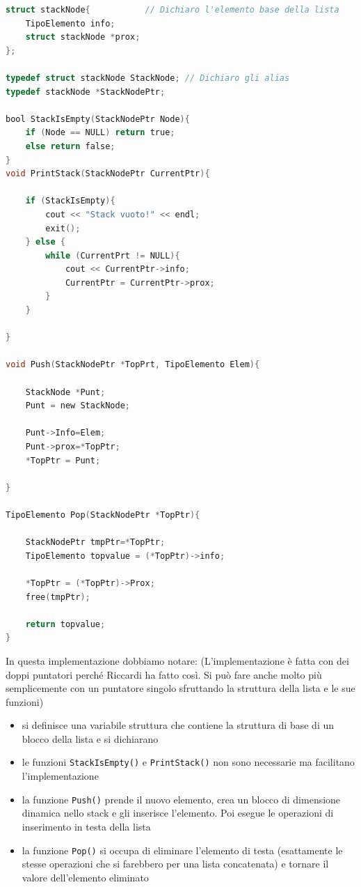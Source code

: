 \documentclass[
  paper=a4,
  oneside  ,captions=tableheading
]{scrbook}
\newcommand{\passthrough}[1]{#1}
\providecommand{\tightlist}{%
  \setlength{\itemsep}{0pt}\setlength{\parskip}{0pt}}
\begin{document}
\begin{lstlisting}[language=C]
struct stackNode{           // Dichiaro l'elemento base della lista
    TipoElemento info;
    struct stackNode *prox;
};

typedef struct stackNode StackNode; // Dichiaro gli alias 
typedef stackNode *StackNodePtr;

bool StackIsEmpty(StackNodePtr Node){
    if (Node == NULL) return true;
    else return false;
}
void PrintStack(StackNodePtr CurrentPtr){
    
    if (StackIsEmpty){
        cout << "Stack vuoto!" << endl;
        exit();
    } else {
        while (CurrentPrt != NULL){
            cout << CurrentPtr->info;
            CurrentPtr = CurrentPtr->prox;
        }
    }
   
}

void Push(StackNodePtr *TopPrt, TipoElemento Elem){
    
    StackNode *Punt;
    Punt = new StackNode;
    
    Punt->Info=Elem;
    Punt->prox=*TopPtr;
    *TopPtr = Punt;
      
}

TipoElemento Pop(StackNodePtr *TopPtr){
    
    StackNodePtr tmpPtr=*TopPtr;
    TipoElemento topvalue = (*TopPtr)->info;
    
    *TopPtr = (*TopPtr)->Prox;
    free(tmpPtr);
    
    return topvalue;
}
\end{lstlisting}

In questa implementazione dobbiamo notare: (L'implementazione è fatta
con dei doppi puntatori perché Riccardi ha fatto così. Si può fare anche
molto più semplicemente con un puntatore singolo sfruttando la struttura
della lista e le sue funzioni)

\begin{itemize}
\tightlist
\item
  si definisce una variabile struttura che contiene la struttura di base
  di un blocco della lista e si dichiarano
\item
  le funzioni \passthrough{\lstinline!StackIsEmpty()!} e
  \passthrough{\lstinline!PrintStack()!} non sono necessarie ma
  facilitano l'implementazione
\item
  la funzione \passthrough{\lstinline!Push()!} prende il nuovo elemento,
  crea un blocco di dimensione dinamica nello stack e gli inserisce
  l'elemento. Poi esegue le operazioni di inserimento in testa della
  lista
\item
  la funzione \passthrough{\lstinline!Pop()!} si occupa di eliminare
  l'elemento di testa (esattamente le stesse operazioni che si farebbero
  per una lista concatenata) e tornare il valore dell'elemento eliminato
\end{itemize}
\end{document}
